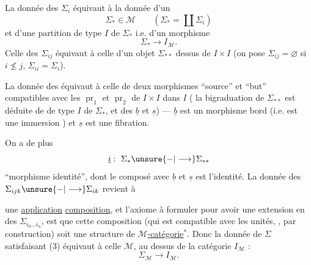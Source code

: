 La donnée des \(\Sigma_i\) équivaut à la donnée d'un
\[
 \Sigma_*\in\mathcal M\qquad
 \left(\Sigma_*=\coprod\Sigma_i\right)
\]
et d'une partition de type \(I\) de \(\Sigma_*\) i.e. d'un morphisme
\[
 \Sigma_*\longrightarrow I_{\mathcal M}.
\]
Celle des \(\Sigma_{ij}\) équivaut à celle
d'un objet \(\Sigma_{**}\)   dessus de \(I\times I\)
(on pose \(\Sigma_{ij}=\varnothing\) si \(i\not\le j\),
\(\Sigma_{ii}=\Sigma_i\)).

La donnée des
équivaut à celle de deux morphismes ``source'' et ``but''
\diagram{\begin{tikzcd}
 \Sigma_{**}\arrow[r,"\underline b"]\arrow[d,"\underline s"']&\Sigma_*\\
 \Sigma_*&
\end{tikzcd}}
compatibles avec les \(\operatorname{pr}_1\) et \(\operatorname{pr}_2\)
de \(I\times I\) dans \(I\)
(
 la bigraduation 
de \(\Sigma_{**}\) est déduite de 
 de type \(I\) de \(\Sigma_*\), et des
\(\underline b\) et \(\underline s\)) ---
 \(\underline b\) est 
un morphisme bord (i.e. est une
immersion ) et \(\underline s\) est une fibration.

On a de plus 
\[
 \underline{i}:\ \Sigma_*\unsure{-|\longrightarrow}\Sigma_{**}
\]
``morphisme identité'', dont le composé avec \(\underline b\) et
\(\underline s\) est l'identité. La donnée des
\(\Sigma_{ijk}\unsure{-|\longrightarrow}\Sigma_{ik}\) revient à

une \uline{application} \uline{composition}, et l'axiome à
formuler pour avoir une extension 
en des \(\Sigma_{i_0\ldots i_n}\), est que cette composition
(qui est compatible avec les unités, ,
par construction) soit une structure de
\uline{\(\mathcal M\)-catégorie}\(^*\). 
Donc la donnée de \(\Sigma\) satisfaisant (3)
équivaut à celle   \(\mathcal M\),
au dessus de la catégorie \(I_{\mathcal M}\) :
\[
 \Sigma_{\mathcal M}\longrightarrow I_{\mathcal M}.
\]

